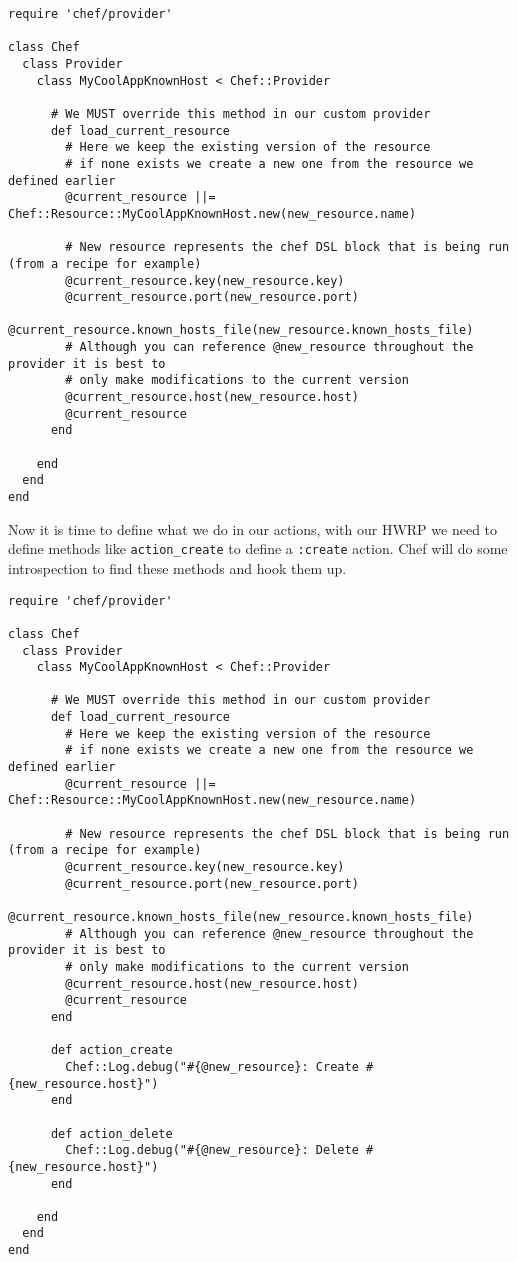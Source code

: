 \begin{lstlisting}[label=lst:cookbook-hwrp6]
require 'chef/provider'

class Chef
  class Provider
    class MyCoolAppKnownHost < Chef::Provider

      # We MUST override this method in our custom provider
      def load_current_resource
        # Here we keep the existing version of the resource
        # if none exists we create a new one from the resource we defined earlier
        @current_resource ||= Chef::Resource::MyCoolAppKnownHost.new(new_resource.name)

        # New resource represents the chef DSL block that is being run (from a recipe for example)
        @current_resource.key(new_resource.key)
        @current_resource.port(new_resource.port)
        @current_resource.known_hosts_file(new_resource.known_hosts_file)
        # Although you can reference @new_resource throughout the provider it is best to
        # only make modifications to the current version
        @current_resource.host(new_resource.host)
        @current_resource
      end

    end
  end
end
\end{lstlisting}

Now it is time to define what we do in our actions, with our HWRP we need to define methods like \lstinline!action_create! to define a \lstinline!:create! action. Chef will do some introspection to find these methods and hook them up.

\begin{lstlisting}[label=lst:cookbook-hwrp7]
require 'chef/provider'

class Chef
  class Provider
    class MyCoolAppKnownHost < Chef::Provider

      # We MUST override this method in our custom provider
      def load_current_resource
        # Here we keep the existing version of the resource
        # if none exists we create a new one from the resource we defined earlier
        @current_resource ||= Chef::Resource::MyCoolAppKnownHost.new(new_resource.name)

        # New resource represents the chef DSL block that is being run (from a recipe for example)
        @current_resource.key(new_resource.key)
        @current_resource.port(new_resource.port)
        @current_resource.known_hosts_file(new_resource.known_hosts_file)
        # Although you can reference @new_resource throughout the provider it is best to
        # only make modifications to the current version
        @current_resource.host(new_resource.host)
        @current_resource
      end

      def action_create
        Chef::Log.debug("#{@new_resource}: Create #{new_resource.host}")
      end

      def action_delete
        Chef::Log.debug("#{@new_resource}: Delete #{new_resource.host}")
      end

    end
  end
end
\end{lstlisting}

